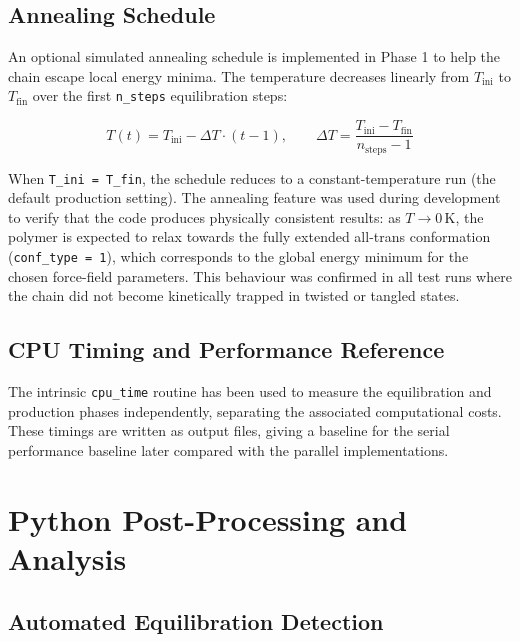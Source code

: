 \documentclass[11pt, a4paper]{article}
\begin{document}
\subsection{Annealing Schedule}

An optional simulated annealing schedule is implemented in Phase 1 to help
the chain escape local energy minima. The temperature decreases linearly
from $T_{\text{ini}}$ to $T_{\text{fin}}$ over the first \texttt{n\_steps}
equilibration steps:

\begin{equation}
  T(t) = T_{\text{ini}} - \Delta T \cdot (t - 1), \qquad
  \Delta T = \frac{T_{\text{ini}} - T_{\text{fin}}}{n_{\text{steps}} - 1}
  \label{eq:annealing}
\end{equation}

When \texttt{T\_ini = T\_fin}, the schedule reduces to a constant-temperature
run (the default production setting). The annealing feature was used during
development to verify that the code produces physically consistent results: as
$T \to 0\,\text{K}$, the polymer is expected to relax towards the fully
extended all-trans conformation (\texttt{conf\_type = 1}), which corresponds
to the global energy minimum for the chosen force-field parameters. This
behaviour was confirmed in all test runs where the chain did not become
kinetically trapped in twisted or tangled states.

\subsection{CPU Timing and Performance Reference}

The intrinsic \texttt{cpu\_time} routine has been used to measure the equilibration and production phases independently, separating the associated computational costs. These timings are written as output files, giving a baseline for the serial performance baseline later compared with the parallel implementations.

\section{Python Post-Processing and Analysis}
\label{sec:postproc}

\subsection{Automated Equilibration Detection}
\end{document}

